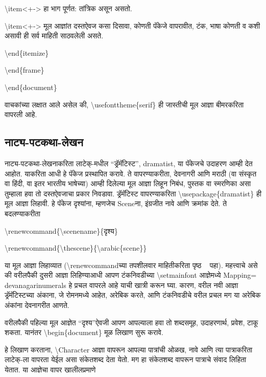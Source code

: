\documentclass[11pt]{article}
\newcommand{\7}{\textbackslash}
\newcommand{\Syn}{\textenglish}
\begin{document}
 \Syn{\7item<+->} हा भाग पूर्णत: तांत्रिक असून असतो.
 
 \Syn{\7item<+->} मूल आज्ञांत दस्तऐवज कसा दिसावा, कोणती पॅकेजे वापरावीत, टंक, भाषा
 कोणती व कशी असावी ही सर्व माहिती साठवलेली असते.

\Syn{\7end\{itemize\}}
 
\Syn{\7end\{frame\}}

\Syn{\7end\{document\}}
\medskip

वाचकांच्या लक्षात आले असेल की, \Syn{\7usefonttheme\{serif\}} ही जास्तीची
मूल आज्ञा बीमरकरिता वापरली आहे.

\subsection{नाट्य-पटकथा-लेखन}

नाट्य-पटकथा-लेखनाकरिता  लाटेक्-मधील ``ड्रॅमॅटिस्ट'', \Syn{dramatist}\index{\Syn{dramatist}}, या पॅकेजचे उदाहरण आम्ही देत आहोत. याकरिता आधी हे पॅकेज प्रस्थापित करावे. ते वापरण्याकरीता, देवनागरी आणि मराठी (वा संस्कृत वा हिंदी, वा इतर भारतीय भाषेच्या) आम्ही दिलेल्या मूल आज्ञा लिहून निबंध, पुस्तक वा स्मरणिका असा तुम्हाला हवा तो दस्तऐवजाचा प्रकार निवडावा. ड्रॅमॅटिस्ट वापरण्याकरिता \Syn{\7usepackage\{dramatist\}} ही मूल आज्ञा लिहावी. हे पॅकेज दृश्यांना, म्हणजेच {\Bask Scene}ना, इंग्रजीत नावे आणि क्रमांक देते. ते बदलण्याकरीता
\smallskip

\noindent \Syn{\7renewcommand\{\7scenename\}\{{\Yvenu दृश्य}\}}

\noindent \Syn{\7renewcommand\{\7thescene\}\{\7arabic\{scene\}\}}
\medskip

या मूल आज्ञा लिहाव्यात (\Syn{\7renewcommand}च्या तपशीलवार माहितीकरिता
पृष्ठ ~\pageref{page:renewcmd} पहा). महत्त्वाचे असे की वरीलपैकी दुसरी आज्ञा
लिहिण्याआधी आपण टंकनिवडीच्या \Syn{\7setmainfont} आज्ञेमध्ये \Syn{Mapping= devanagarinumerals} हे प्रचल वापरले आहे याची खात्री करून घ्या. कारण, वरील नवी आज्ञा ड्रॅमॅटिस्टच्या अंकाना, जे रोमनमध्ये आहेत, अरेबिक करते, आणि टंकनिवडीचे वरील प्रचल मग या अरेबिक अंकांना देवनागरीत आणते.

वरीलपैकी पहिल्या मूल आज्ञेत ``दृश्य''ऐवजी आपण आपल्याला हवा तो शब्दसमूह, उदाहरणार्थ, प्रवेश, टाकू शकता. यानंतर \Syn{\7begin\{document\}} मूळ लिखाण सुरू करावे.

हे लिखाण करताना, \Syn{\7Character}\index{\Syn{\7Character}} आज्ञा वापरून आपल्या पात्रांची ओळख, नावे आणि त्या पात्राकरिता लाटेक्-ला वापरता येईल असा संकेतशब्द देता येतो. मग हा संकेतशब्द वापरून पात्राचे संवाद लिहिता येतात. या आज्ञेचा वापर खालीलप्रमाणे
\smallskip
\end{document}
